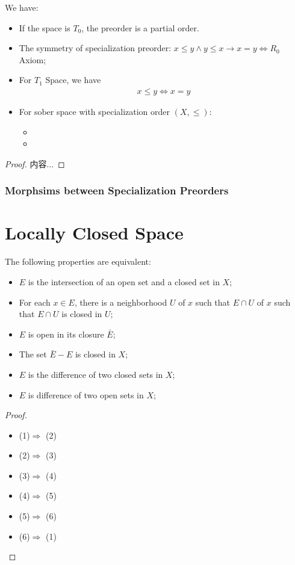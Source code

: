 \documentclass[Total.tex]{subfiles}
\begin{document}
				\begin{proposition}
					We have:
					\begin{itemize}
						\item If the space is $T_0$, the preorder is a partial order.
						\item The symmetry of specialization preorder: $x\leq y\wedge y\leq x\rightarrow x=y\Leftrightarrow R_0$ Axiom;
						\item For $T_1$ Space, we have
						\begin{gather*}
							x\leq y\Leftrightarrow x=y
						\end{gather*} 
						\item For sober space with specialization order $(X,\leq)$:
							\begin{itemize}
								\item 
								\item 
							\end{itemize}
					\end{itemize}
				\end{proposition}
				\begin{proof}
					内容...
				\end{proof}
				
				\subsubsection{Morphsims between Specialization Preorders}
					
		\section{Locally Closed Space}
			\begin{proposition}
				The following properties are equivalent:
				\begin{itemize}
					\item $E$ is the intersection of an open set and a closed set in $X$; 
					\item For each $x\in E$, there is a neighborhood $U$ of $x$ such that $E\cap U$ of $x$ such that $E\cap U$ is closed in $U$;
					\item $E$ is open in its closure $\bar{E}$;
					\item The set $\bar{E}-E$ is closed in $X$;
					\item $E$ is the difference of two closed sets in $X$;
					\item $E$ is difference of two open sets in $X$;
				\end{itemize}
			\end{proposition}
			\begin{proof}
				\begin{itemize}
					\item (1)$\Rightarrow$ (2)
					\item (2)$\Rightarrow$ (3)
					\item (3)$\Rightarrow$ (4)
					\item (4)$\Rightarrow$ (5)
					\item (5)$\Rightarrow$ (6)
					\item (6)$\Rightarrow$ (1)
				\end{itemize}
			\end{proof}
\end{document}
